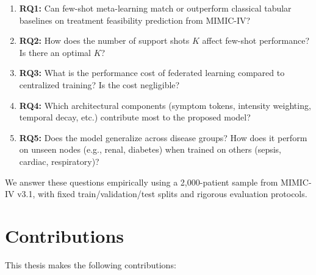 \begin{enumerate}
\item \textbf{RQ1:} Can few-shot meta-learning match or outperform classical tabular baselines on treatment feasibility prediction from MIMIC-IV?

\item \textbf{RQ2:} How does the number of support shots $K$ affect few-shot performance? Is there an optimal $K$?

\item \textbf{RQ3:} What is the performance cost of federated learning compared to centralized training? Is the cost negligible?

\item \textbf{RQ4:} Which architectural components (symptom tokens, intensity weighting, temporal decay, etc.) contribute most to the proposed model?

\item \textbf{RQ5:} Does the model generalize across disease groups? How does it perform on unseen nodes (e.g., renal, diabetes) when trained on others (sepsis, cardiac, respiratory)?
\end{enumerate}

We answer these questions empirically using a 2,000-patient sample from MIMIC-IV v3.1, with fixed train/validation/test splits and rigorous evaluation protocols.

\section{Contributions}

This thesis makes the following contributions:

